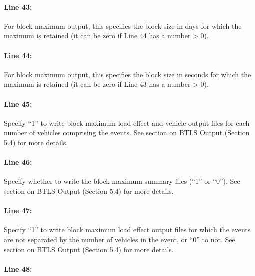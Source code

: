\documentclass[
]{article}
\begin{document}
\paragraph*{Line 43:}\label{line-43}

For block maximum output, this specifies the block size in days for
which the maximum is retained (it can be zero if Line 44 has a number
\textgreater{} 0).

\paragraph*{Line 44:}\label{line-44}

For block maximum output, this specifies the block size in seconds for
which the maximum is retained (it can be zero if Line 43 has a number
\textgreater{} 0).

\paragraph*{Line 45:}\label{line-45}

Specify ``1'' to write block maximum load effect and vehicle output
files for each number of vehicles comprising the events. See section on
BTLS Output (Section 5.4) for more details.

\paragraph*{Line 46:}\label{line-46}

Specify whether to write the block maximum summary files (``1'' or
``0''). See section on BTLS Output (Section 5.4) for more details.

\paragraph*{Line 47:}\label{line-47}

Specify ``1'' to write block maximum load effect output files for which
the events are not separated by the number of vehicles in the event, or
``0'' to not. See section on BTLS Output (Section 5.4) for more details.

\paragraph*{Line 48:}\label{line-48}
\end{document}
